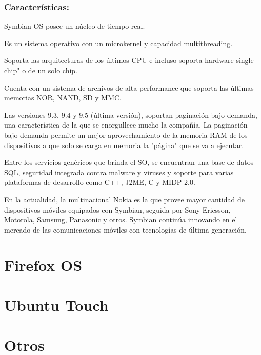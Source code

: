 \subsubsection*{Características:}
Symbian OS posee un núcleo de tiempo real. 

Es un sistema operativo con un microkernel y capacidad multithreading. 

Soporta las arquitecturas de los últimos CPU e incluso soporta hardware single-chip" o de un solo chip.

Cuenta con un sistema de archivos de alta performance que soporta las últimas memorias NOR, NAND, SD y MMC.

Las versiones 9.3, 9.4 y 9.5 (última versión), soportan paginación bajo demanda, una característica de la que se enorgullece mucho la compañía. La paginación bajo demanda 
permite un mejor aprovechamiento de la memoria RAM de los dispositivos a que solo se carga en memoria la "página" que se va a ejecutar.

Entre los servicios genéricos que brinda el SO, se encuentran una base de datos SQL, seguridad integrada contra malware y viruses y soporte para varias plataformas de 
desarrollo como C++, J2ME, C y MIDP 2.0.

En la actualidad, la multinacional Nokia es la que provee mayor cantidad de dispositivos móviles equipados con Symbian, seguida por Sony Ericsson, Motorola, Samsung, 
Panasonic y otros. Symbian continúa innovando en el mercado de las comunicaciones móviles con tecnologías de última generación.

\section*{Firefox OS}
\section*{Ubuntu Touch}
\section*{Otros}








